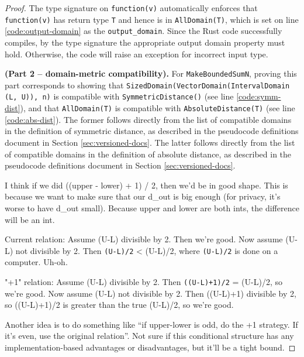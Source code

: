 \documentclass[11pt,a4paper]{article}
\theoremstyle{definition}
\newcommand{\connor}[1]{{ {\color{teal}{(connor)~#1}}}}
\begin{document}
\begin{proof}
    The type signature on \texttt{function(v)} automatically enforces that \texttt{function(v)} has return type \texttt{T} and hence is in \texttt{AllDomain(T)}, which is set on line \ref{code:output-domain} as the \texttt{output\_domain}. Since the Rust code successfully compiles, by the type signature the appropriate output domain property must hold. Otherwise, the code will raise an exception for incorrect input type.
    
    \smallskip
    
    \textbf{(Part 2 -- domain-metric compatibility).} For \texttt{MakeBoundedSumN}, proving this part corresponds to showing that \texttt{SizedDomain(VectorDomain(IntervalDomain (L, U)), n)} is compatible with \texttt{SymmetricDistance()} (see line \ref{code:symm-dist}), and that \texttt{AllDomain(T)} is compatible with \texttt{AbsoluteDistance(T)} (see line \ref{code:abs-dist}).
    The former follows directly from the list of compatible domains in the definition of symmetric distance, as described in the pseudocode definitions document in Section \ref{sec:versioned-docs}. The latter follows directly from the list of compatible domains in the definition of absolute distance, as described in the pseudocode definitions document in Section \ref{sec:versioned-docs}. 
    
    
    \iffalse
    \smallskip
    
    \connor{Problem with current stability guarantee. Ideas copied from Slack, so sorry about the formatting.}
    
    \color{teal}
    
    I think if we did ((upper - lower) + 1) / 2, then we'd be in good shape. This is because we want to make sure that our d\_out is big enough (for privacy, it's worse to have d\_out small). Because upper and lower are both ints, the difference will be an int.

    Current relation: Assume (U-L) divisible by 2. Then we're good. Now assume (U-L) not divisible by 2. Then \texttt{(U-L)/2} < (U-L)/2, where \texttt{(U-L)/2} is done on a computer. Uh-oh.

    "+1" relation: Assume (U-L) divisible by 2. Then \texttt{((U-L)+1)/2} = (U-L)/2, so we're good. Now assume (U-L) not divisible by 2. Then ((U-L)+1) divisible by 2, so ((U-L)+1)/2 is greater than the true (U-L)/2, so we're good.
    
    
    Another idea is to do something like ``if upper-lower is odd, do the +1 strategy. If it's even, use the original relation''. Not sure if this conditional structure has any implementation-based advantages or disadvantages, but it'll be a tight bound.
    

\end{proof}
\end{document}
